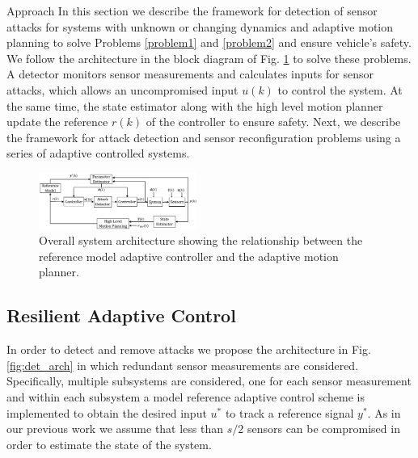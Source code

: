 
\begin{section}{Approach}
\label{sec:approach}
In this section we describe the framework for detection of sensor attacks for systems with unknown or changing dynamics and adaptive motion planning to solve Problems \ref{problem1} and \ref{problem2} and ensure vehicle's safety. We follow the architecture in the block diagram of Fig. \ref{fig:system_arch} to solve these problems. A detector monitors sensor measurements and calculates inputs for sensor attacks, which allows an uncompromised input $u(k)$ to control the system. At the same time, the state estimator along with the high level motion planner update the reference $r(k)$ of the controller to ensure safety. Next, we describe the framework for attack detection and sensor reconfiguration problems using a series of adaptive controlled systems.

\begin{figure}[ht!]
\vspace{1pt}
\centering
\includegraphics[width=0.46\textwidth]{Figures/sys_arch.png}
\caption{Overall system architecture showing the relationship between the reference model adaptive controller and the adaptive motion planner.}
\label{fig:system_arch}
\end{figure}

\subsection{Resilient Adaptive Control}
\label{sec:Res_adapt_control}


In order to detect and remove attacks we propose the architecture in Fig. \ref{fig:det_arch} in which redundant sensor measurements are considered. Specifically, multiple subsystems are considered, one for each sensor measurement and within each subsystem a model reference adaptive control scheme is implemented to obtain the desired input $u^*$ to track a reference signal $y^*$. As in our previous work \cite{6943080,6843720} we assume that less than $s/2$ sensors can be compromised in order to estimate the state of the system.




\end{section}
